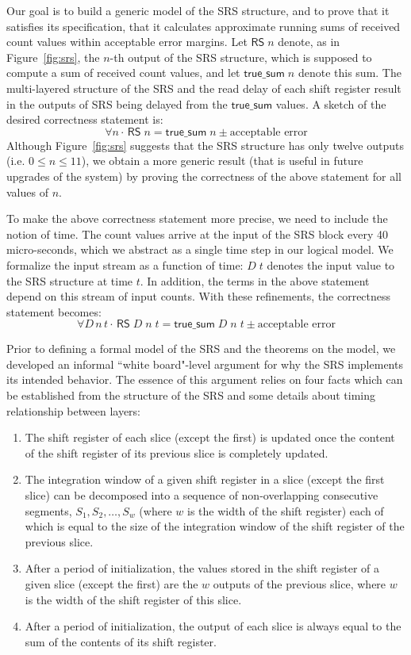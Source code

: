 \documentclass{llncs}
\begin{document}
Our goal is to build a generic model of the SRS structure, and to prove that it satisfies its specification, that it calculates approximate running sums of received count values within acceptable error margins.
Let $\mathsf{RS}\;n$ denote, as in Figure~\ref{fig:srs}, the $n$-th output of the SRS structure, which is supposed to compute a sum of received count values, and let $\mathsf{true\_sum}\;n$ denote this sum.
The multi-layered structure of the SRS and the read delay of each shift register result in the outputs of SRS being delayed from the $\mathsf{true\_sum}$ values.
A sketch of the desired correctness statement is: \[\forall{n} \cdot \, \mathsf{RS}\;n= \mathsf{true\_sum}\; n \pm\text{acceptable error}\]
Although Figure~\ref{fig:srs} suggests that the SRS structure has only twelve outputs  (i.e. $0\leq{n}\leq11$), we obtain a more generic result (that is useful in future upgrades of the system) by proving the correctness of the above statement for all values of $n$.

To make the above correctness statement more precise, we need to include the notion of time.
The count values arrive at the input of the SRS block every 40 micro-seconds, which we abstract as a single time step in our logical model.
We formalize the input stream as a function of time: $D\;t$ denotes the input value to the SRS structure at time $t$.
In addition, the terms in the above statement depend on this stream of input counts.
With these refinements, the correctness statement becomes: \[\forall{D\,n\,t} \cdot \,\mathsf{RS}\;D\;n\;t = \mathsf{true\_sum}\;D\;n\;t\pm\text{acceptable error}\]

Prior to defining a formal model of the SRS and the theorems on the model, we developed an informal ``white board"-level argument for why the SRS implements its intended behavior.
The essence of this argument relies on four facts which can be established from the structure of the SRS and some details about timing relationship between layers:
\begin{enumerate}
\item The shift register of each slice (except the first) is updated once the content of the shift register of its previous slice is completely updated.
\item The integration window of a given shift register in a slice (except the first slice) can be decomposed into a sequence of  non-overlapping consecutive segments, $S_1, S_2, \ldots, S_w$ (where $w$ is the width of the shift register) each of which is equal to the size of the integration window of the shift register of the previous slice.
\item After a period of initialization, the values stored in the shift register of a given slice (except the first) are the $w$ outputs of the previous slice, where $w$ is the width of the shift register of this slice.
\item After a period of initialization, the output of each slice is always equal to the sum of the contents of its shift register.
\end{enumerate}
\end{document}
